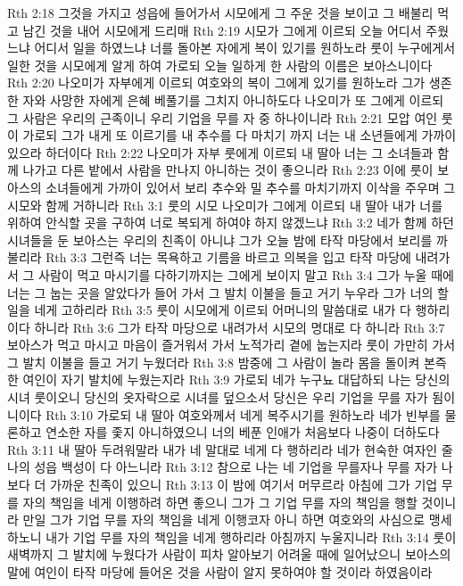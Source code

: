 Rth 2:18  그것을 가지고 성읍에 들어가서 시모에게 그 주운 것을 보이고 그 배불리 먹고 남긴 것을 내어 시모에게 드리매
Rth 2:19  시모가 그에게 이르되 오늘 어디서 주웠느냐 어디서 일을 하였느냐 너를 돌아본 자에게 복이 있기를 원하노라 룻이 누구에게서 일한 것을 시모에게 알게 하여 가로되 오늘 일하게 한 사람의 이름은 보아스니이다
Rth 2:20  나오미가 자부에게 이르되 여호와의 복이 그에게 있기를 원하노라 그가 생존한 자와 사망한 자에게 은혜 베풀기를 그치지 아니하도다 나오미가 또 그에게 이르되 그 사람은 우리의 근족이니 우리 기업을 무를 자 중 하나이니라
Rth 2:21  모압 여인 룻이 가로되 그가 내게 또 이르기를 내 추수를 다 마치기 까지 너는 내 소년들에게 가까이 있으라 하더이다
Rth 2:22  나오미가 자부 룻에게 이르되 내 딸아 너는 그 소녀들과 함께 나가고 다른 밭에서 사람을 만나지 아니하는 것이 좋으니라
Rth 2:23  이에 룻이 보아스의 소녀들에게 가까이 있어서 보리 추수와 밀 추수를 마치기까지 이삭을 주우며 그 시모와 함께 거하니라
Rth 3:1  룻의 시모 나오미가 그에게 이르되 내 딸아 내가 너를 위하여 안식할 곳을 구하여 너로 복되게 하여야 하지 않겠느냐
Rth 3:2  네가 함께 하던 시녀들을 둔 보아스는 우리의 친족이 아니냐 그가 오늘 밤에 타작 마당에서 보리를 까불리라
Rth 3:3  그런즉 너는 목욕하고 기름을 바르고 의복을 입고 타작 마당에 내려가서 그 사람이 먹고 마시기를 다하기까지는 그에게 보이지 말고
Rth 3:4  그가 누울 때에 너는 그 눕는 곳을 알았다가 들어 가서 그 발치 이불을 들고 거기 누우라 그가 너의 할일을 네게 고하리라
Rth 3:5  룻이 시모에게 이르되 어머니의 말씀대로 내가 다 행하리이다 하니라
Rth 3:6  그가 타작 마당으로 내려가서 시모의 명대로 다 하니라
Rth 3:7  보아스가 먹고 마시고 마음이 즐거워서 가서 노적가리 곁에 눕는지라 룻이 가만히 가서 그 발치 이불을 들고 거기 누웠더라
Rth 3:8  밤중에 그 사람이 놀라 몸을 돌이켜 본즉 한 여인이 자기 발치에 누웠는지라
Rth 3:9  가로되 네가 누구뇨 대답하되 나는 당신의 시녀 룻이오니 당신의 옷자락으로 시녀를 덮으소서 당신은 우리 기업을 무를 자가 됨이니이다
Rth 3:10  가로되 내 딸아 여호와께서 네게 복주시기를 원하노라 네가 빈부를 물론하고 연소한 자를 좇지 아니하였으니 너의 베푼 인애가 처음보다 나중이 더하도다
Rth 3:11  내 딸아 두려워말라 내가 네 말대로 네게 다 행하리라 네가 현숙한 여자인 줄 나의 성읍 백성이 다 아느니라
Rth 3:12  참으로 나는 네 기업을 무를자나 무를 자가 나보다 더 가까운 친족이 있으니
Rth 3:13  이 밤에 여기서 머무르라 아침에 그가 기업 무를 자의 책임을 네게 이행하려 하면 좋으니 그가 그 기업 무를 자의 책임을 행할 것이니라 만일 그가 기업 무를 자의 책임을 네게 이행코자 아니 하면 여호와의 사심으로 맹세하노니 내가 기업 무를 자의 책임을 네게 행하리라 아침까지 누울지니라
Rth 3:14  룻이 새벽까지 그 발치에 누웠다가 사람이 피차 알아보기 어려울 때에 일어났으니 보아스의 말에 여인이 타작 마당에 들어온 것을 사람이 알지 못하여야 할 것이라 하였음이라
